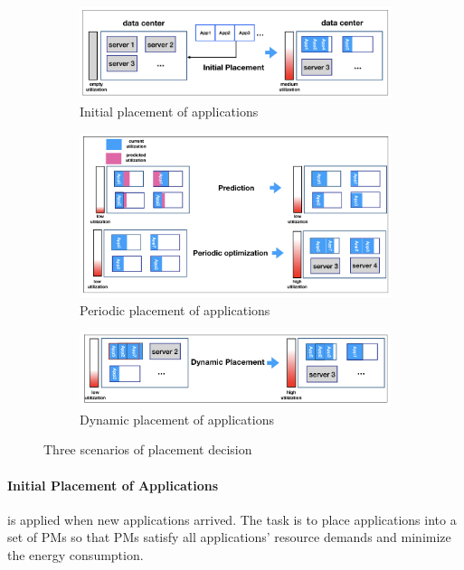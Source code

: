 \begin{figure}
	\centering
	\begin{subfigure}[b]{0.9\textwidth}
		\includegraphics[width=\textwidth]{pics/initial_placement.png}
		\caption{Initial placement of applications}
	\end{subfigure}
	\begin{subfigure}[b]{0.9\textwidth}
		\includegraphics[width=\textwidth]{pics/periodic_optimization.png}
	\caption{Periodic placement of applications}
	\end{subfigure}
	\begin{subfigure}[b]{0.9\textwidth}
		\includegraphics[width=\textwidth]{pics/dynamic_placement.png}
	\caption{Dynamic placement of applications}
	\end{subfigure}
	\caption{Three scenarios of placement decision}
	\label{fig:management}
\end{figure}

\paragraph{Initial Placement of Applications} is applied when new applications arrived. The task is to place applications into a set of PMs \cite{Mishra:2012kx} so that PMs satisfy all applications' resource demands and minimize the energy consumption.



